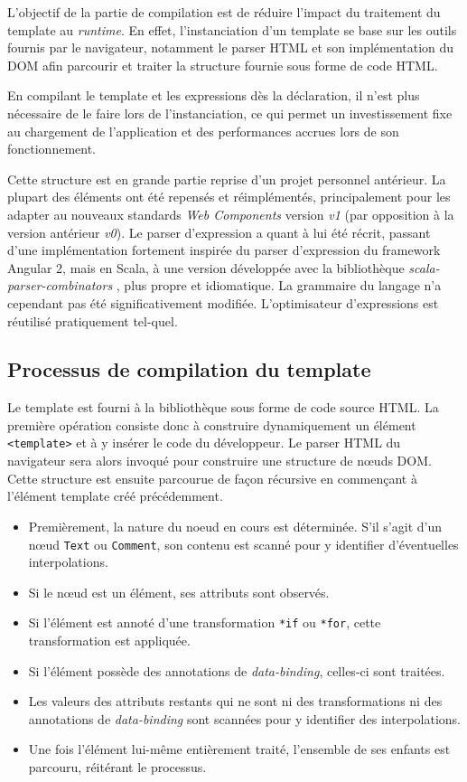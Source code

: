 L'objectif de la partie de compilation est de réduire l'impact du traitement du template au \emph{runtime}. En effet, l'instanciation d'un template se base sur les outils fournis par le navigateur, notamment le parser HTML et son implémentation du DOM afin parcourir et traiter la structure fournie sous forme de code HTML.

En compilant le template et les expressions dès la déclaration, il n'est plus nécessaire de le faire lors de l'instanciation, ce qui permet un investissement fixe au chargement de l'application et des performances accrues lors de son fonctionnement.

Cette structure est en grande partie reprise d'un projet personnel antérieur. La plupart des éléments ont été repensés et réimplémentés, principalement pour les adapter au nouveaux standards \emph{Web Components} version \emph{v1} (par opposition à la version antérieur \emph{v0}). Le parser d'expression a quant à lui été récrit, passant d'une implémentation fortement inspirée du parser d'expression du framework Angular 2, mais en Scala, à une version développée avec la bibliothèque \emph{scala-parser-combinators} \cite{scala-parser-combinators}, plus propre et idiomatique. La grammaire du langage n'a cependant pas été significativement modifiée. L'optimisateur d'expressions est réutilisé pratiquement tel-quel.

\subsection{Processus de compilation du template}

Le template est fourni à la bibliothèque sous forme de code source HTML. La première opération consiste donc à construire dynamiquement un élément \texttt{<template>} et à y insérer le code du développeur. Le parser HTML du navigateur sera alors invoqué pour construire une structure de nœuds DOM. Cette structure est ensuite parcourue de façon récursive en commençant à l'élément template créé précédemment.

\begin{itemize}
	\item Premièrement, la nature du noeud en cours est déterminée. S'il s'agit d'un nœud \texttt{Text} ou \texttt{Comment}, son contenu est scanné pour y identifier d'éventuelles interpolations.
	\item Si le nœud est un élément, ses attributs sont observés.
	\item Si l'élément est annoté d'une transformation \texttt{*if} ou \texttt{*for}, cette transformation est appliquée.
	\item Si l'élément possède des annotations de \emph{data-binding}, celles-ci sont traitées.
	\item Les valeurs des attributs restants qui ne sont ni des transformations ni des annotations de \emph{data-binding} sont scannées pour y identifier des interpolations.
	\item Une fois l'élément lui-même entièrement traité, l'ensemble de ses enfants est parcouru, réitérant le processus.
\end{itemize}

